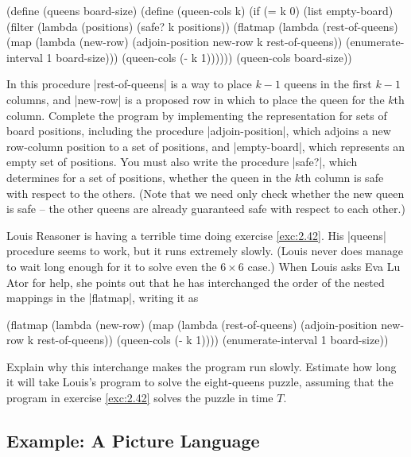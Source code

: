 \begin{Exercise}
\begin{Exercise}
\begin{schemedisplay}
(define (queens board-size)
  (define (queen-cols k)  
    (if (= k 0)
        (list empty-board)
        (filter
         (lambda (positions) (safe? k positions))
         (flatmap
          (lambda (rest-of-queens)
            (map (lambda (new-row)
                   (adjoin-position new-row k rest-of-queens))
                 (enumerate-interval 1 board-size)))
          (queen-cols (- k 1))))))
  (queen-cols board-size))
\end{schemedisplay}
In this procedure \scheme|rest-of-queens| is a way to place $k - 1$
queens in the first $k - 1$ columns, and \scheme|new-row| is a
proposed row in which to place the queen for the $k$th column.
Complete the program by implementing the representation for sets of
board positions, including the procedure \scheme|adjoin-position|,
which adjoins a new row-column position to a set of positions, and
\scheme|empty-board|, which represents an empty set of positions.  You
must also write the procedure \scheme|safe?|, which determines for a
set of positions, whether the queen in the $k$th column is safe with
respect to the others.  (Note that we need only check whether the new
queen is safe -- the other queens are already guaranteed safe with
respect to each other.)



\begin{Exercise}
\label{exc:2.43}
Louis Reasoner is having a terrible time doing exercise \ref{exc:2.42}.  His
\scheme|queens| procedure seems to work, but it runs extremely slowly.
(Louis never does manage to wait long enough for it to solve even the
$6 \times 6$ case.)  When Louis asks Eva Lu Ator for help, she points
out that he has interchanged the order of the nested mappings in the
\scheme|flatmap|, writing it as
\begin{schemedisplay}
(flatmap
 (lambda (new-row)
   (map (lambda (rest-of-queens)
          (adjoin-position new-row k rest-of-queens))
        (queen-cols (- k 1))))
 (enumerate-interval 1 board-size))
\end{schemedisplay}
Explain why this interchange makes the program run slowly.  Estimate
how long it will take Louis's program to solve the eight-queens
puzzle, assuming that the program in exercise \ref{exc:2.42} solves
the puzzle in time $T$.



\subsection{Example: A Picture Language}
\label{sec:2.2.4}




\end{Exercise}
\end{Exercise}
\end{Exercise}
